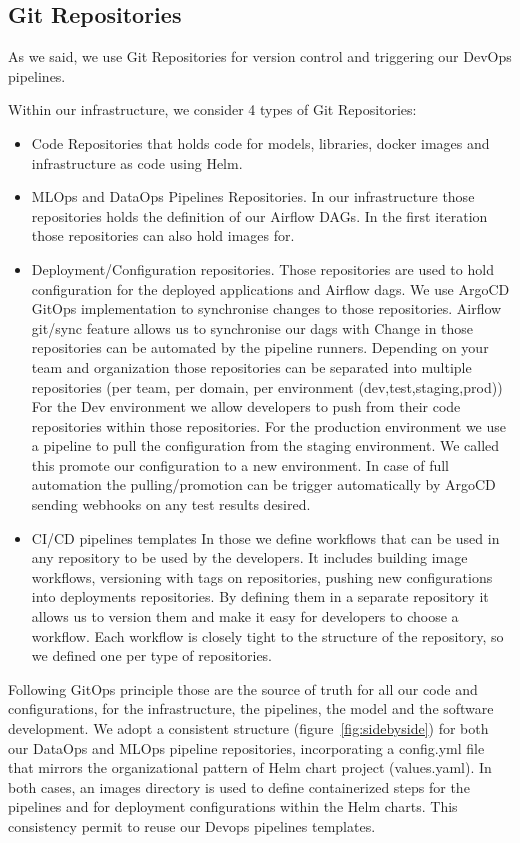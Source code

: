 \subsection{Git Repositories}\label{subsec:git-repositories}
As we said, we use Git Repositories for version control and triggering our DevOps pipelines.

Within our infrastructure, we consider 4 types of Git Repositories:

\begin{itemize}
    \item Code Repositories that holds code for models, libraries, docker images and infrastructure as code using Helm.
    \item MLOps and DataOps Pipelines Repositories.
    In our infrastructure those repositories holds the definition of our Airflow DAGs.
    In the first iteration those repositories can also hold images for.
    \item Deployment/Configuration repositories.
    Those repositories are used to hold configuration for the deployed applications and Airflow dags.
    We use ArgoCD GitOps implementation to synchronise changes to those repositories.
    Airflow git/sync feature allows us to synchronise our dags with
    Change in those repositories can be automated by the pipeline runners.
    Depending on your team and organization those repositories can be separated into multiple repositories (per team, per domain, per environment (dev,test,staging,prod))
    For the Dev environment we allow developers to push from their code repositories within those repositories.
    For the production environment we use a pipeline to pull the configuration from the staging environment.
    We called this promote our configuration to a new environment.
    In case of full automation the pulling/promotion can be trigger automatically by ArgoCD sending webhooks on any test results desired.
    \item CI/CD pipelines templates
    In those we define workflows that can be used in any repository to be used by the developers.
    It includes building image workflows, versioning with tags on repositories, pushing new configurations into deployments repositories.
    By defining them in a separate repository it allows us to version them and make it easy for developers to choose a workflow.
    Each workflow is closely tight to the structure of the repository, so we defined one per type of repositories.
\end{itemize}

Following GitOps principle those are the source of truth for all our code and configurations, for the infrastructure, the pipelines, the model and the software development.
We adopt a consistent structure (figure~\ref{fig:sidebyside}) for both our DataOps and MLOps pipeline repositories, incorporating a config.yml file that mirrors the organizational pattern of Helm chart project (values.yaml).
In both cases, an images directory is used to define containerized steps for the pipelines and for deployment configurations within the Helm charts.
This consistency permit to reuse our Devops pipelines templates.

